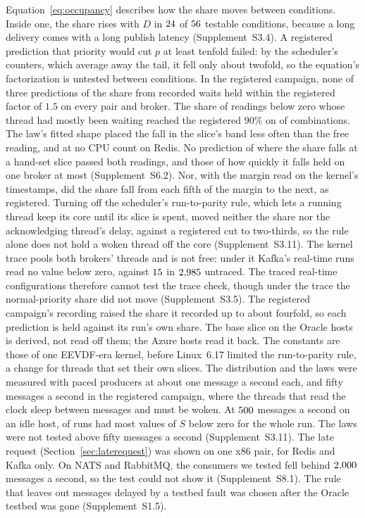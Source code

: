 \documentclass[10pt,journal,compsoc]{IEEEtran}
\newcommand{\kafka}{Kafka}
\newcommand{\redis}{Redis}
\begin{document}
Equation~\ref{eq:occupancy} describes how the share moves between conditions. Inside one, the share
rises with $D$ in $24$ of $56$ testable conditions, because a long delivery comes with
a long publish latency (Supplement~S3.4). A registered prediction that priority would cut $p$ at
least tenfold failed: by the scheduler's counters, which average away the tail, it fell only about twofold, so the equation's factorization is untested
between conditions. In the registered campaign, none of three predictions of the share from
recorded waits held within the registered factor of $1.5$ on every pair and broker. The share of
readings below zero whose thread had mostly been waiting reached the registered $90\%$ on
\recMostlyWaitingHoldsWord{} of \recMostlyWaitingPartsWord{} combinations. The law's fitted shape
placed the fall in the slice's band less often than the free reading, and at no CPU count on
\redis{}. No prediction of where the share falls at a hand-set slice passed both readings, and
those of how quickly it falls held on one broker at most (Supplement~S6.2). Nor, with the margin
read on the kernel's timestamps, did the share fall from each fifth of the margin to the next, as
registered. Turning off the scheduler's run-to-parity rule, which lets a running thread keep its
core until its slice is spent, moved neither the share nor the acknowledging thread's delay,
against a registered cut to two-thirds, so the rule alone does not hold a woken thread off the core
(Supplement~S3.11). The kernel trace pools both brokers' threads and is not free: under it
\kafka{}'s real-time runs read no value below zero, against $15$ in
$2{,}985$ untraced. The traced real-time configurations therefore cannot test the trace
check, though under the trace the normal-priority share did not move (Supplement~S3.5). The
registered campaign's recording raised the share it recorded up to about fourfold, so each prediction is held against its run's own share. The base slice on the
Oracle hosts is derived, not read off them; the Azure hosts read it back. The constants are those
of one EEVDF-era kernel, before Linux~6.17 limited the run-to-parity rule, a change for threads that
set their own slices. The distribution and the laws were measured with paced producers at about one
message a second each, and fifty messages a second in the registered campaign, where the threads
that read the clock sleep between messages and must be woken. At $500$ messages a second on
an idle host, \osMidSplitRunsWord{} of \osMidRunsWord{} runs had most values of $S$ below zero for
the whole run. The laws were not tested above fifty messages a second (Supplement~S3.11). The late
request (Section~\ref{sec:laterequest}) was shown on one x86 pair, for \redis{} and \kafka{} only.
On NATS and RabbitMQ, the consumers we tested fell behind $2{,}000$ messages a second, so the
test could not show it (Supplement~S8.1). The rule that leaves out messages delayed by
a testbed fault was chosen after the Oracle testbed was gone (Supplement~S1.5).
\end{document}
